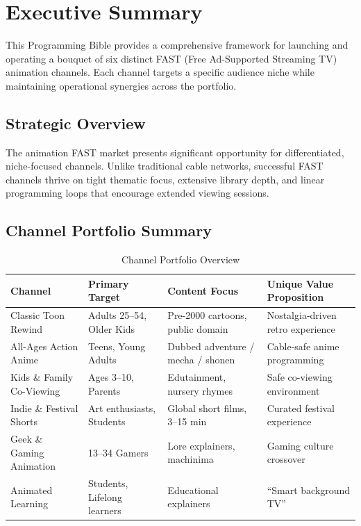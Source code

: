 \documentclass[12pt,letterpaper,twoside]{report}
\begin{document}
\listoftables
\clearpage

\chapter*{Executive Summary}

This Programming Bible provides a comprehensive framework for launching and operating a bouquet of six distinct FAST (Free Ad-Supported Streaming TV) animation channels. Each channel targets a specific audience niche while maintaining operational synergies across the portfolio.

\section*{Strategic Overview}

The animation FAST market presents significant opportunity for differentiated, niche-focused channels. Unlike traditional cable networks, successful FAST channels thrive on tight thematic focus, extensive library depth, and linear programming loops that encourage extended viewing sessions.

\section*{Channel Portfolio Summary}

\begin{table}[H]
\centering
\caption{Channel Portfolio Overview}
\label{tab:portfolio-overview}
\begin{tabular}{@{}L{3cm}L{3cm}L{3.5cm}L{4cm}@{}}
\toprule
\textbf{Channel} & \textbf{Primary Target} & \textbf{Content Focus} & \textbf{Unique Value Proposition} \\
\midrule
Classic Toon Rewind & Adults 25--54, Older Kids & Pre-2000 cartoons, public domain & Nostalgia-driven retro experience \\
\addlinespace
All-Ages Action Anime & Teens, Young Adults & Dubbed adventure / mecha / shonen & Cable-safe anime programming \\
\addlinespace
Kids \& Family Co-Viewing & Ages 3--10, Parents & Edutainment, nursery rhymes & Safe co-viewing environment \\
\addlinespace
Indie \& Festival Shorts & Art enthusiasts, Students & Global short films, 3--15 min & Curated festival experience \\
\addlinespace
Geek \& Gaming Animation & 13--34 Gamers & Lore explainers, machinima & Gaming culture crossover \\
\addlinespace
Animated Learning & Students, Lifelong learners & Educational explainers & ``Smart background TV'' \\
\bottomrule
\end{tabular}
\end{table}
\end{document}
